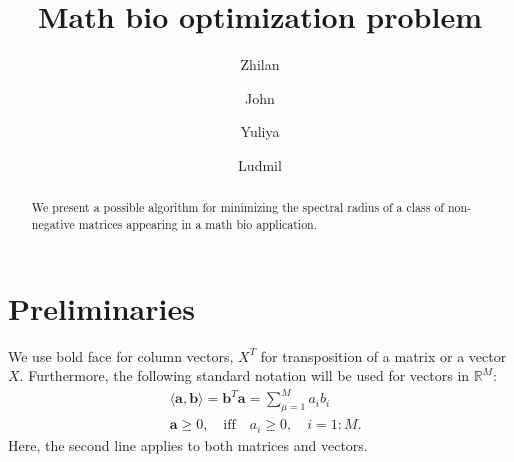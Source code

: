 \documentclass[12pt]{amsart}
\title{Math bio optimization problem}
\author{Zhilan \and John \and Yuliya \and Ludmil}
\theoremstyle{definition}
\begin{document}
\begin{abstract}
We present a possible algorithm for minimizing the spectral radius of a class of non-negative matrices appearing in a math bio application. 
\end{abstract}

\maketitle


\section{Preliminaries}

We use bold face for column vectors, $X^T$ for transposition of a matrix or a vector $X$. 
Furthermore, the following standard notation will be used for vectors in $\mathds{R}^{M}$:
\begin{equation}
  \begin{aligned}
    &\langle \bm{a},\bm{b}\rangle = \bm{b}^T\bm a = \sum_{\mu=1}^M a_i b_i\\
    &\bm{a}\ge 0,\quad\mbox{iff} \quad a_i\ge 0,\quad i=1:M. 
  \end{aligned}
\end{equation}
Here, the second line applies to both matrices and vectors. 
\end{document}
